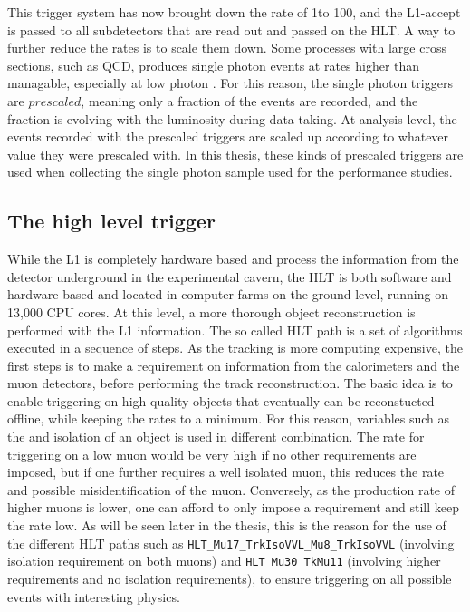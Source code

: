This trigger system has now brought down the rate of 1\GHz to 100\kHz, and the L1-accept is passed to all subdetectors that are read out and passed on the HLT.
A way to further reduce the rates is to scale them down. 
Some processes with large cross sections, such as QCD, produces single photon events at rates higher than managable, especially at low photon \pt. 
For this reason, the single photon triggers are $prescaled$, meaning only a fraction of the events are recorded, and the fraction is evolving with the luminosity during data-taking. 
At analysis level, the events recorded with the prescaled triggers are scaled up according to whatever value they were prescaled with. 
In this thesis, these kinds of prescaled triggers are used when collecting the single photon sample used for the \ptmiss performance studies.  
\subsection*{The high level trigger}
\noindent
\justify
While the L1 is completely hardware based and process the information from the detector underground in the experimental cavern, the HLT is both software and hardware based and located in computer farms on the ground level, running on 13,000 CPU cores. 
At this level, a more thorough object reconstruction is performed with the L1 information. The so called HLT path is a set of algorithms executed in a sequence of steps. 
As the tracking is more computing expensive, the first steps is to make a requirement on information from the calorimeters and the muon detectors, before performing the track reconstruction. 
The basic idea is to enable triggering on high quality objects that eventually can be reconstucted offline, while keeping the rates to a minimum. 
For this reason, variables such as the \pt and isolation of an object is used in different combination. 
The rate for triggering on a low \pt muon would be very high if no other requirements are imposed, but if one further requires a well isolated muon, this reduces the rate and possible misidentification of the muon. 
Conversely, as the production rate of higher \pt muons is lower, one can afford to only impose a \pt requirement and still keep the rate low.   
As will be seen later in the thesis, this is the reason for the use of the different HLT paths such as \texttt{HLT\_Mu17\_TrkIsoVVL\_Mu8\_TrkIsoVVL} (involving isolation requirement on both muons) and \texttt{HLT\_Mu30\_TkMu11} (involving higher \pt requirements and no isolation requirements), to ensure triggering on all possible events with interesting physics.
